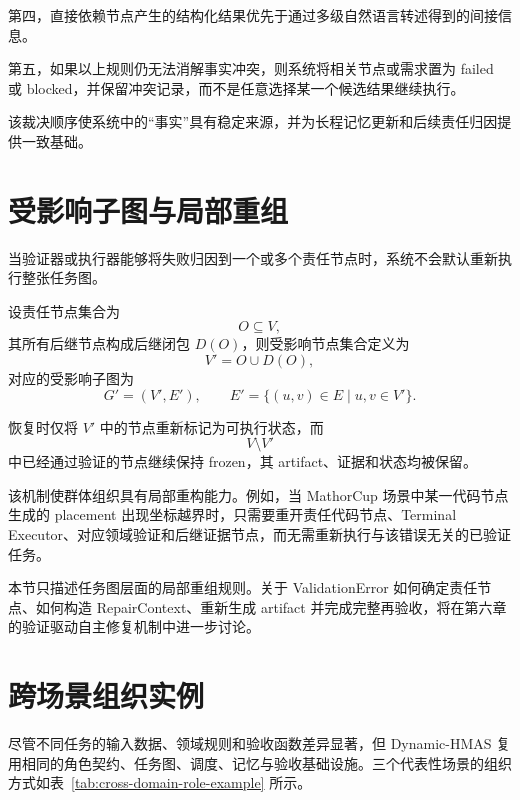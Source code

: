 \documentclass[UTF8,a4paper,12pt,oneside]{ctexbook}
\begin{document}
第四，直接依赖节点产生的结构化结果优先于通过多级自然语言转述得到的间接信息。

第五，如果以上规则仍无法消解事实冲突，则系统将相关节点或需求置为 failed 或 blocked，并保留冲突记录，而不是任意选择某一个候选结果继续执行。

该裁决顺序使系统中的“事实”具有稳定来源，并为长程记忆更新和后续责任归因提供一致基础。


\section{受影响子图与局部重组}

当验证器或执行器能够将失败归因到一个或多个责任节点时，系统不会默认重新执行整张任务图。

设责任节点集合为
\[
O\subseteq V,
\]
其所有后继节点构成后继闭包 $D(O)$，则受影响节点集合定义为
\[
V'
=
O\cup D(O),
\]
对应的受影响子图为
\[
G'
=
(V',E'),
\qquad
E'
=
\{(u,v)\in E\mid u,v\in V'\}.
\]

恢复时仅将 $V'$ 中的节点重新标记为可执行状态，而
\[
V\setminus V'
\]
中已经通过验证的节点继续保持 frozen，其 artifact、证据和状态均被保留。

该机制使群体组织具有局部重构能力。例如，当 MathorCup 场景中某一代码节点生成的 placement 出现坐标越界时，只需要重开责任代码节点、Terminal Executor、对应领域验证和后继证据节点，而无需重新执行与该错误无关的已验证任务。

本节只描述任务图层面的局部重组规则。关于 ValidationError 如何确定责任节点、如何构造 RepairContext、重新生成 artifact 并完成完整再验收，将在第六章的验证驱动自主修复机制中进一步讨论。


\section{跨场景组织实例}

尽管不同任务的输入数据、领域规则和验收函数差异显著，但 Dynamic-HMAS 复用相同的角色契约、任务图、调度、记忆与验收基础设施。三个代表性场景的组织方式如表~\ref{tab:cross-domain-role-example} 所示。
\end{document}
